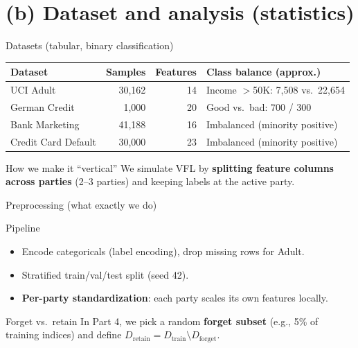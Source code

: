 \documentclass[aspectratio=169, 11pt]{beamer}
\begin{document}
\section{(b) Dataset and analysis (statistics)}

\begin{frame}{Datasets (tabular, binary classification)}
  \begin{center}
  \small
  \begin{tabular}{@{}lrrp{6.8cm}@{}}
    \toprule
    \textbf{Dataset} & \textbf{Samples} & \textbf{Features} & \textbf{Class balance (approx.)} \\
    \midrule
    UCI Adult & 30{,}162 & 14 & Income $>$50K: 7{,}508 vs.\ 22{,}654 \\
    German Credit & 1{,}000 & 20 & Good vs.\ bad: 700 / 300 \\
    Bank Marketing & 41{,}188 & 16 & Imbalanced (minority positive) \\
    Credit Card Default & 30{,}000 & 23 & Imbalanced (minority positive) \\
    \bottomrule
  \end{tabular}
  \end{center}

  \vspace{0.6em}
  \begin{block}{How we make it ``vertical''}
    We simulate VFL by \textbf{splitting feature columns across parties} (2--3 parties) and keeping labels at the active party.
  \end{block}
\end{frame}

\begin{frame}{Preprocessing (what exactly we do)}
  \begin{block}{Pipeline}
    \begin{itemize}
      \item Encode categoricals (label encoding), drop missing rows for Adult.
      \item Stratified train/val/test split (seed 42).
      \item \textbf{Per-party standardization}: each party scales its own features locally.
    \end{itemize}
  \end{block}
  \vspace{0.6em}
  \begin{exampleblock}{Forget vs.\ retain}
    In Part 4, we pick a random \textbf{forget subset} (e.g., 5\% of training indices) and define
    \(D_{\text{retain}} = D_{\text{train}} \setminus D_{\text{forget}}\).
  \end{exampleblock}
\end{frame}
\end{document}

